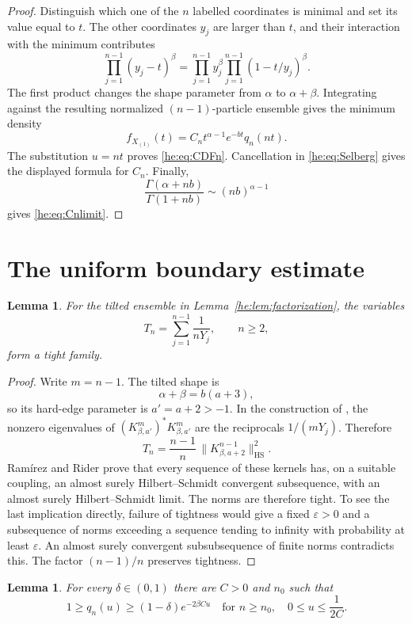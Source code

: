 \documentclass[11pt,a4paper]{article}
\newtheorem{lemma}[theorem]{Lemma}
\theoremstyle{definition}
\theoremstyle{remark}
\newcommand{\HS}{\mathrm{HS}}
\begin{document}
\begin{proof}
Distinguish which one of the $n$ labelled coordinates is minimal and
set its value equal to $t$.  The other coordinates $y_j$ are larger
than $t$, and their interaction with the minimum contributes
\[
 \prod_{j=1}^{n-1}(y_j-t)^\beta
 =\prod_{j=1}^{n-1}y_j^\beta
  \prod_{j=1}^{n-1}(1-t/y_j)^\beta.
\]
The first product changes the shape parameter from $\alpha$ to
$\alpha+\beta$.  Integrating against the resulting normalized
$(n-1)$-particle ensemble gives the minimum density
\[
 f_{X_{(1)}}(t)=C_n t^{\alpha-1}e^{-bt}q_n(nt).
\]
The substitution $u=nt$ proves \eqref{he:eq:CDFn}.
Cancellation in \eqref{he:eq:Selberg} gives the displayed formula for
$C_n$.  Finally,
\[
 \frac{\Gamma(\alpha+nb)}{\Gamma(1+nb)}
 \sim (nb)^{\alpha-1}
\]
gives \eqref{he:eq:Cnlimit}.
\end{proof}

\section{The uniform boundary estimate}

\begin{lemma}\label{he:lem:tight}
For the tilted ensemble in Lemma~\ref{he:lem:factorization}, the variables
\[
 T_n=\sum_{j=1}^{n-1}\frac1{nY_j},\qquad n\geq2,
\]
form a tight family.
\end{lemma}

\begin{proof}
Write $m=n-1$.  The tilted shape is
\[
 \alpha+\beta=b(a+3),
\]
so its hard-edge parameter is $a'=a+2>-1$.
In the construction of \cite[Section~2 and Lemma~6]{heRR}, the nonzero
eigenvalues of
$(K^m_{\beta,a'})^*K^m_{\beta,a'}$ are the reciprocals
$1/(mY_j)$.  Therefore
\[
 T_n=\frac{n-1}{n}\,
       \|K^{n-1}_{\beta,a+2}\|_{\HS}^2.
\]
Ram\'irez and Rider prove that every sequence of these kernels has,
on a suitable coupling, an almost surely Hilbert--Schmidt convergent
subsequence, with an almost surely Hilbert--Schmidt limit.
The norms are therefore tight.  To see the last implication directly,
failure of tightness would give a fixed $\varepsilon>0$ and a
subsequence of norms exceeding a sequence tending to infinity with
probability at least $\varepsilon$.  An almost surely convergent
subsubsequence of finite norms contradicts this.
The factor $(n-1)/n$ preserves tightness.
\end{proof}

\begin{lemma}\label{he:lem:uniform}
For every $\delta\in(0,1)$ there are $C>0$ and $n_0$ such that
\begin{equation}\label{he:eq:uniformq}
 1\geq q_n(u)\geq(1-\delta)e^{-2\beta Cu}
 \quad\text{for }n\geq n_0,\quad0\leq u\leq\frac1{2C}.
\end{equation}
\end{lemma}
\end{document}
